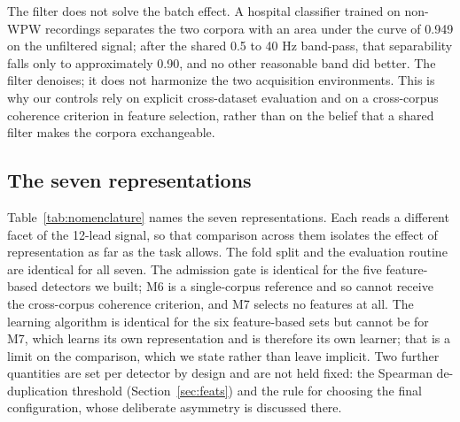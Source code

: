 \documentclass[11pt]{article}
\begin{document}
The filter does not solve the batch effect. A hospital classifier trained on non-WPW recordings separates the two corpora with an area under the curve of 0.949 on the unfiltered signal; after the shared 0.5 to 40 Hz band-pass, that separability falls only to approximately 0.90, and no other reasonable band did better. The filter denoises; it does not harmonize the two acquisition environments. This is why our controls rely on explicit cross-dataset evaluation and on a cross-corpus coherence criterion in feature selection, rather than on the belief that a shared filter makes the corpora exchangeable.

\subsection{The seven representations}

Table~\ref{tab:nomenclature} names the seven representations. Each reads a different facet of the 12-lead signal, so that comparison across them isolates the effect of representation as far as the task allows. The fold split and the evaluation routine are identical for all seven. The admission gate is identical for the five feature-based detectors we built; M6 is a single-corpus reference and so cannot receive the cross-corpus coherence criterion, and M7 selects no features at all. The learning algorithm is identical for the six feature-based sets but cannot be for M7, which learns its own representation and is therefore its own learner; that is a limit on the comparison, which we state rather than leave implicit. Two further quantities are set per detector by design and are not held fixed: the Spearman de-duplication threshold (Section~\ref{sec:feats}) and the rule for choosing the final configuration, whose deliberate asymmetry is discussed there.
\end{document}
